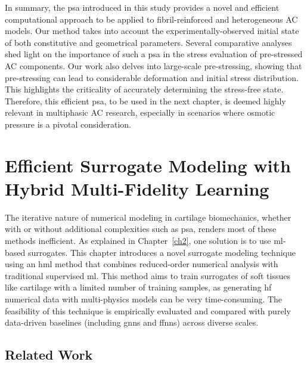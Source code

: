 \documentclass[12pt,a4paper]{report}
\begin{document}
In summary, the \ac{psa} introduced in this study provides a novel and efficient computational approach to be applied to fibril-reinforced and heterogeneous AC models. Our method takes into account the experimentally-observed initial state of both constitutive and geometrical parameters. Several comparative analyses shed light on the importance of such a \ac{psa} in the stress evaluation of pre-stressed AC components. Our work also delves into large-scale pre-stressing, showing that pre-stressing can lead to considerable deformation and initial stress distribution. This highlights the criticality of accurately determining the stress-free state. Therefore, this efficient \ac{psa}, to be used in the next chapter, is deemed highly relevant in multiphasic AC research, especially in scenarios where osmotic pressure is a pivotal consideration.


\chapter{Efficient Surrogate Modeling with Hybrid Multi-Fidelity Learning}\label{ch4}

The iterative nature of numerical modeling in cartilage biomechanics, whether with or without additional complexities such as \ac{psa}, renders most of these methods inefficient. As explained in Chapter~\ref{ch2}, one solution is to use \ac{ml}-based surrogates. This chapter introduces a novel surrogate modeling technique using an \ac{hml} method that combines reduced-order numerical analysis with traditional supervised \ac{ml}. This method aims to train surrogates of soft tissues like cartilage with a limited number of training samples, as generating \ac{hf} numerical data with multi-physics models can be very time-consuming. The feasibility of this technique is empirically evaluated and compared with purely data-driven baselines (including \acp{gnn} and \acp{ffnn}) across diverse scales.

\section{Related Work}
\end{document}
